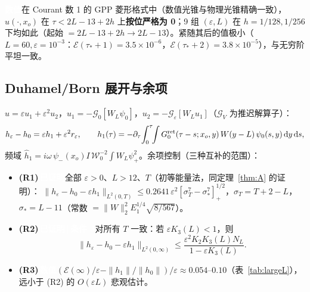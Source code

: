 \documentclass[11pt,a4paper,fontset=windows]{ctexart}
\newcommand{\tagbox}[2]{\begingroup\setlength{\fboxsep}{1.4pt}\colorbox{#1}{\textcolor{white}{\footnotesize\bfseries #2}}\endgroup}
\newcommand{\proven}{\tagbox{green!45!black}{已证明}}
\newcommand{\condJ}{\tagbox{blue!65!black}{已证明\,|\,条件 J}}
\newcommand{\numer}{\tagbox{orange!85!black}{数值}}
\theoremstyle{definition}
\theoremstyle{definition}
\newcommand{\eps}{\varepsilon}
\newcommand{\cE}{\mathcal E}
\newcommand{\cW}{\mathcal W}
\newcommand{\cG}{\mathcal G}
\newcommand{\dd}{\mathrm d}
\newcommand{\tauS}{\tau_*}
\begin{document}
\numer\enspace 在 Courant 数 1 的 GPP 菱形格式中（数值光锥与物理光锥精确一致），$u(\cdot,x_o)$ 在 $\tau<2L-13+2h$ 上\textbf{按位严格为 0}；9 组 $(\eps,L)$ 在 $h=1/128,1/256$ 下均如此（起始 $=2L-13+2h\to2L-13$）。紧随其后的值极小（$L=60,\eps=10^{-3}$：$\cE(\tauS+1)=3.5\times10^{-6}$，$\cE(\tauS+2)=3.8\times10^{-5}$），与无穷阶平坦一致。

\subsection{Duhamel/Born 展开与余项}
$u=\eps u_1+\eps^2u_2$，$u_1=-\cG_0[W_L\psi_0]$，$u_2=-\cG_\eps[W_Lu_1]$（$\cG_V$ 为推迟解算子）：
\[
h_\eps-h_0=\eps h_1+\eps^2r_\eps,\qquad h_1(\tau)=-\partial_\tau\!\int_0^\tau\!\!\int G_0^{\rm ret}(\tau-s;x_o,y)\,W(y-L)\,\psi_0(s,y)\,\dd y\,\dd s,
\]
频域 $\hat h_1=i\omega\,\psi_-(x_o)I\,\cW_0^{-2}\int W_L\psi_+^2$。余项控制（三种互补的范围）：
\begin{itemize}
\item \textbf{(R1)}\,\proven\enspace 全部 $\eps>0$、$L>12$、$T$（初等能量法，同定理~\ref{thm:A} 的证明）：
$\|h_\eps-h_0-\eps h_1\|_{L^2(0,T)}\le0.2641\,\eps^2[\sigma_T^7-\sigma_*^7]_+^{1/2}$，$\sigma_T=T+2-L$，$\sigma_*=L-11$（常数 $=\|W\|_2^2E_1^{1/4}\sqrt{8/567}$）。
\item \textbf{(R2)}\,\condJ\enspace 对所有 $T$ 一致：若 $\eps K_3(L)<1$，则
\[\|h_\eps-h_0-\eps h_1\|_{L^2(0,\infty)}\le\frac{\eps^2K_2K_3(L)N_L}{1-\eps K_3(L)}.\]
\item \textbf{(R3)}\,\numer\enspace $(\cE(\infty)/\eps-\|h_1\|/\|h_0\|)/\eps\approx0.054$--$0.10$（表~\ref{tab:largeL}），远小于 (R2) 的 $O(\eps L)$ 悲观估计。
\end{itemize}
\end{document}
